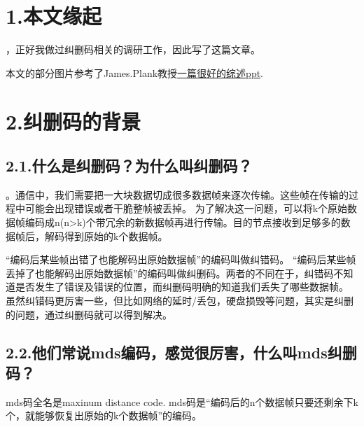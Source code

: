 \documentclass{article}
\begin{document}
\mdxtitleblockstart{}
\mdxauthorstart{}
\mdxauthorend\mdtitleauthorrunning{}{}\mdxtitleblockend%

\section{1.\hspace*{0.5em}本文缘起}\label{section}%

，正好我做过纠删码相关的调研工作，因此写了这篇文章。%

本文的部分图片参考了James.Plank教授\href{http://web.eecs.utk.edu/~plank/plank/papers/FAST-2013-Tutorial.html}{一篇很好的综述ppt}.%

\section{2.\hspace*{0.5em}纠删码的背景}\label{section}%

\subsection{2.1.\hspace*{0.5em}什么是纠删码？为什么叫纠删码？}\label{section}%

。通信中，我们需要把一大块数据切成很多数据帧来逐次传输。这些帧在传输的过程中可能会出现错误或者干脆整帧被丢掉。
为了解决这一问题，可以将k个原始数据帧编码成n(n\textgreater{}k)个带冗余的新数据帧再进行传输。目的节点接收到足够多的数据帧后，解码得到原始的k个数据帧。%

\textquotedblleft{}编码后某些帧出错了也能解码出原始数据帧\textquotedblright{}的编码叫做纠错码。
\textquotedblleft{}编码后某些帧丢掉了也能解码出原始数据帧\textquotedblright{}的编码叫做纠删码。两者的不同在于，纠错码不知道是否发生了错误及错误的位置，而纠删码明确的知道我们丢失了哪些数据帧。
虽然纠错码更厉害一些，但比如网络的延时/丢包，硬盘损毁等问题，其实是纠删的问题，通过纠删码就可以得到解决。%

\subsection{2.2.\hspace*{0.5em}他们常说mds编码，感觉很厉害，什么叫mds纠删码？}\label{sec-mdsmds}%

\noindent mds码全名是maxinum distance code. mds码是“编码后的n个数据帧只要还剩余下k个，就能够恢复出原始的k个数据帧”的编码。%
\end{document}
